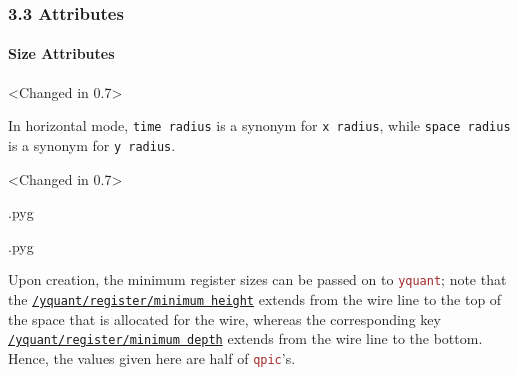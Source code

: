 \documentclass{scrartcl}
\makeatletter
\newenvironment{codeexample}{%
   \VerbatimEnvironment%
   \let\FVB@VerbatimOut\minted@FVB@VerbatimOut
   \let\FVE@VerbatimOut\minted@FVE@VerbatimOut
   \minted@configlang{tex}%
   \minted@fvset
   \begin{VerbatimOut}[codes={\catcode`\^^I=12},firstline,lastline]{\minted@jobname.pyg}%
}{
   \end{VerbatimOut}%
   \minted@langlinenoson%
   \savebox\codeexamplebox{ \minted@jobname.pyg}%
   \ifdim\wd\codeexamplebox>\dimexpr.5\linewidth-3mm\relax%
      \wd\codeexamplebox=.5\linewidth%
   \else%
      \wd\codeexamplebox=\dimexpr\wd\codeexamplebox+3mm\relax%
   \fi%
   \noindent\begin{minipage}{\wd\codeexamplebox}%
      \centering%
      \usebox\codeexamplebox%
   \end{minipage}%
   \begin{minipage}{\dimexpr\linewidth-\wd\codeexamplebox\relax}%
      \expandafter\minted@pygmentize\expandafter{\minted@lang}%
   \end{minipage}%
   \minted@langlinenosoff%
   \par%
}
\newenvironment{codeexample*}{%
   \VerbatimEnvironment%
   \let\FVB@VerbatimOut\minted@FVB@VerbatimOut
   \let\FVE@VerbatimOut\minted@FVE@VerbatimOut
   \minted@configlang{tex}%
   \minted@fvset
   \begin{VerbatimOut}[codes={\catcode`\^^I=12},firstline,lastline]{\minted@jobname.pyg}%
}{
   \end{VerbatimOut}%
   \minted@langlinenoson%
   \begin{adjustbox}{center}
       \minted@jobname.pyg %
   \end{adjustbox}\nopagebreak
   \expandafter\minted@pygmentize\expandafter{\minted@lang}%
   \minted@langlinenosoff%
   \par%
}
\def\pkg#1{\textcolor{brown}{\texttt{#1}}}
\def\style#1{\hyperref[style:#1]{\texttt{#1}}}
\def\Yquant{\pkg{yquant}}
\makeatother
\begin{document}
         \subsubsection{3.3 Attributes}
            \paragraph{Size Attributes}
               \begin{example}<Changed in 0.7>
                  \begin{codeexample*}
                  \end{codeexample*}
                  In horizontal mode, \texttt{time radius} is a synonym for \texttt{x radius}, while \texttt{space radius} is a synonym for \texttt{y radius}.
               \end{example}

               \begin{example}<Changed in 0.7>
                  \begin{codeexample}
                  \end{codeexample}
               \end{example}

               \begin{example}
                  \begin{codeexample}
                  \end{codeexample}
                  Upon creation, the minimum register sizes can be passed on to \Yquant; note that the \style{/yquant/register/minimum height} extends from the wire line to the top of the space that is allocated for the wire, whereas the corresponding key \style{/yquant/register/minimum depth} extends from the wire line to the bottom.
                  Hence, the values given here are half of \pkg{qpic}'s.
               \end{example}
\end{document}

